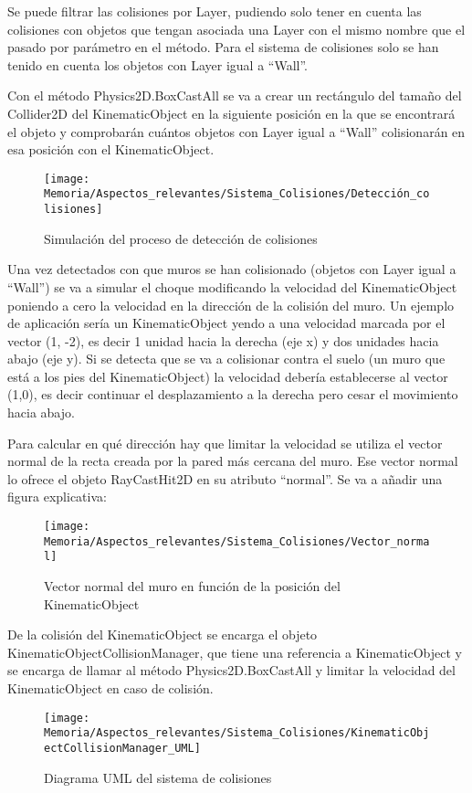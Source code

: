 Se puede filtrar las colisiones por Layer, pudiendo solo tener en cuenta las colisiones con objetos que tengan asociada una Layer con el mismo nombre que el pasado por parámetro en el método. Para el sistema de colisiones solo se han tenido en cuenta los objetos con Layer igual a “Wall”.

Con el método Physics2D.BoxCastAll se va a crear un rectángulo del tamaño del Collider2D del KinematicObject en la siguiente posición en la que se encontrará el objeto y comprobarán cuántos objetos con Layer igual a “Wall” colisionarán en esa posición con el KinematicObject.

\clearpage
\begin{figure}[h]
\centering
\texttt{[image: Memoria/Aspectos\_relevantes/Sistema\_Colisiones/Detección\_colisiones]}
\caption{Simulación del proceso de detección de colisiones}
\end{figure}

Una vez detectados con que muros se han colisionado (objetos con Layer igual a “Wall”) se va a simular el choque modificando la velocidad del KinematicObject poniendo a cero la velocidad en la dirección de la colisión del muro. Un ejemplo de aplicación sería un KinematicObject yendo a una velocidad marcada por el vector (1, -2), es decir 1 unidad hacia la derecha (eje x) y dos unidades hacia abajo (eje y). Si se detecta que se va a colisionar contra el suelo (un muro que está a los pies del KinematicObject) la velocidad debería establecerse al vector (1,0), es decir continuar el desplazamiento a la derecha pero cesar el movimiento hacia abajo.

Para calcular en qué dirección hay que limitar la velocidad se utiliza el vector normal de la recta creada por la pared más cercana del muro. Ese vector normal lo ofrece el objeto RayCastHit2D en su atributo “normal”.
Se va a añadir una figura explicativa:

\clearpage
\begin{figure}[h]
\centering
\texttt{[image: Memoria/Aspectos\_relevantes/Sistema\_Colisiones/Vector\_normal]}
\caption{Vector normal del muro en función de la posición del KinematicObject}
\end{figure}

De la colisión del KinematicObject se encarga el objeto KinematicObjectCollisionManager, que tiene una referencia a KinematicObject y se encarga de llamar al método Physics2D.BoxCastAll y limitar la velocidad del KinematicObject en caso de colisión.

\begin{figure}[h]
\centering
\texttt{[image: Memoria/Aspectos\_relevantes/Sistema\_Colisiones/KinematicObjectCollisionManager\_UML]}
\caption{Diagrama UML del sistema de colisiones}
\end{figure}

